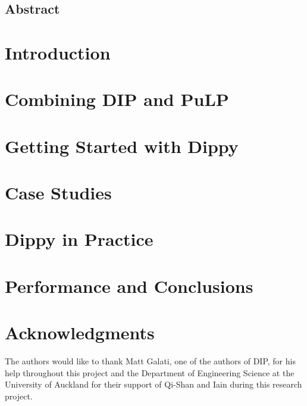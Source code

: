 \documentclass[12pt,a4paper,onecolumn,twoside]{article}
\begin{document}
\pagestyle{plain} \thispagestyle{empty}


\subsection*{Abstract}


\section{Introduction} \label{scn:intro}


\section{Combining \ac{DIP} and PuLP} \label{scn:overview}


\section{Getting Started with Dippy} \label{scn:starting}


\section{Case Studies} \label{scn:define}


\section{Dippy in Practice} \label{scn:techs}


\section{Performance and Conclusions} \label{scn:concl}


\newpage
\section{Acknowledgments}

The authors would like to thank Matt Galati, one of the authors of \ac{DIP}, for his help throughout this project and the Department of Engineering Science at the University of Auckland for their support of Qi-Shan and Iain during this research project.
\\
\\
\\
\vspace*{-0.5\baselineskip}
%
%


\end{document}
